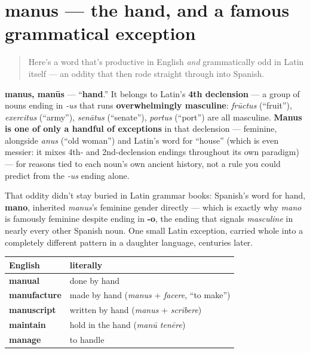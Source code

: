 \section[manus]{manus — the hand, and a famous grammatical exception}

\label{lesson:LA-C08-manus}



\begin{quote}
Here's a word that's productive in English \emph{and} grammatically odd in Latin itself — an oddity that then rode straight through into Spanish.
\end{quote}

\begin{cousinweb}
\textbf{manus, manūs} — \textquotedblleft{}\textbf{hand}.\textquotedblright{} It belongs to Latin's \textbf{4th declension} — a group of nouns ending in \emph{-us} that runs \textbf{overwhelmingly masculine}: \emph{frūctus} (\textquotedblleft{}fruit\textquotedblright{}), \emph{exercitus} (\textquotedblleft{}army\textquotedblright{}), \emph{senātus} (\textquotedblleft{}senate\textquotedblright{}), \emph{portus} (\textquotedblleft{}port\textquotedblright{}) are all masculine. \textbf{Manus is one of only a handful of exceptions} in that declension — feminine, alongside \emph{anus} (\textquotedblleft{}old woman\textquotedblright{}) and Latin's word for \textquotedblleft{}house\textquotedblright{} (which is even messier: it mixes 4th- and 2nd-declension endings throughout its own paradigm) — for reasons tied to each noun's own ancient history, not a rule you could predict from the \emph{-us} ending alone.

That oddity didn't stay buried in Latin grammar books: Spanish's word for hand, \textbf{mano}, inherited \emph{manus}'s feminine gender directly — which is exactly why \emph{mano} is famously feminine despite ending in \textbf{-o}, the ending that signals \emph{masculine} in nearly every other Spanish noun. One small Latin exception, carried whole into a completely different pattern in a daughter language, centuries later.
\end{cousinweb}

\begin{cousinweb}
\noindent
\begin{tabularx}{\linewidth}{@{}>{\raggedright\arraybackslash}X>{\raggedright\arraybackslash}X@{}}
\toprule
\textbf{English} & \textbf{literally} \\
\midrule
\textbf{manual} & done by hand \\
\textbf{manufacture} & made by hand (\emph{manus} + \emph{facere}, \textquotedblleft{}to make\textquotedblright{}) \\
\textbf{manuscript} & written by hand (\emph{manus} + \emph{scrībere}) \\
\textbf{maintain} & hold in the hand (\emph{manū tenēre}) \\
\textbf{manage} & to handle \\
\bottomrule
\end{tabularx}
\end{cousinweb}

